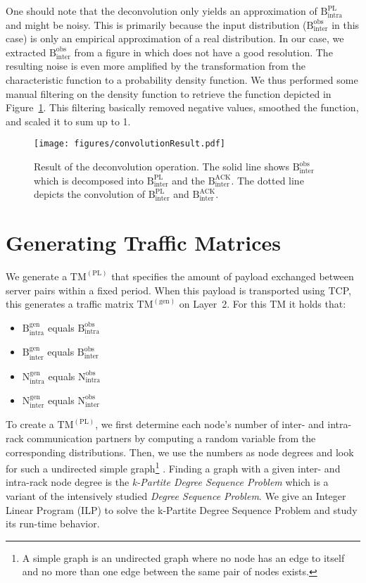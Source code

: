 \documentclass[journal,10pt]{IEEEtran}
\newcommand{\lt}{Layer~2}
\newcommand{\gentm}{\ensuremath{\mathrm{TM}^{(\mathrm{gen})}}}
\newcommand{\pltm}{\ensuremath{\mathrm{TM}^{(\mathrm{PL})}}}
\newcommand{\bytes}[2]{\ensuremath{\mathrm{B}^{\mathrm{#1}}_{\mathrm{#2}}}}
\newcommand{\partners}[2]{\ensuremath{\mathrm{N}^{\mathrm{#1}}_{\mathrm{#2}}}}
\begin{document}
	
	One should note that the deconvolution only yields an approximation of \bytes{PL}{intra} and might be noisy.
	This is primarily because the input distribution (\bytes{obs}{inter} in this case) is only an empirical approximation of a real distribution.
	In our case, we extracted \bytes{obs}{inter} from a figure in \cite{MSR-datacenters} which does not have a good resolution.
	The resulting noise is even more amplified by the transformation from the characteristic function to a 
	probability density function.
	We thus performed some manual filtering on the density function to retrieve the function depicted in Figure~\ref{fig:convolution}.
	This filtering basically removed negative values, smoothed the function, and scaled it to sum up to 1.
	

\begin{figure}
	\centering
	\texttt{[image: figures/convolutionResult.pdf]}
	\caption{Result of the deconvolution operation. The solid line shows \bytes{obs}{inter} which is decomposed into 
	\bytes{PL}{inter} and the \bytes{ACK}{inter}.
	The dotted line depicts the convolution of \bytes{PL}{inter} and \bytes{ACK}{inter}.}
	\label{fig:convolution}
\end{figure}


\section{Generating Traffic Matrices}		
\label{sec:tm}
		We generate a \pltm{} that specifies the amount of payload exchanged between server pairs within a fixed period.
		When this payload is transported using TCP, this generates a traffic matrix \gentm{} on \lt{}. For this TM it holds that:
		\begin{itemize}
			\item \bytes{gen}{intra} equals \bytes{obs}{intra}
			\item \bytes{gen}{inter} equals \bytes{obs}{inter}
			\item \partners{gen}{intra} equals \partners{obs}{intra}
			\item \partners{gen}{inter} equals \partners{obs}{inter}
		\end{itemize}
		
		To create a \pltm{}, we first determine each node's number of inter- and intra-rack communication partners by computing a random variable from 
		the corresponding distributions.	Then, we use the numbers as node degrees and look for such a 
		undirected simple graph\footnote{A simple graph is an undirected graph where no node has an edge to itself and no more than one edge between the same pair of nodes exists.} .
		Finding a graph with a given inter- and intra-rack node degree 
		is the \emph{k-Partite Degree Sequence Problem} which is a variant
		of the intensively studied \emph{Degree Sequence Problem}. We give an Integer Linear Program (ILP) to solve the 
		k-Partite Degree Sequence Problem and study its run-time behavior.
		
\end{document}
